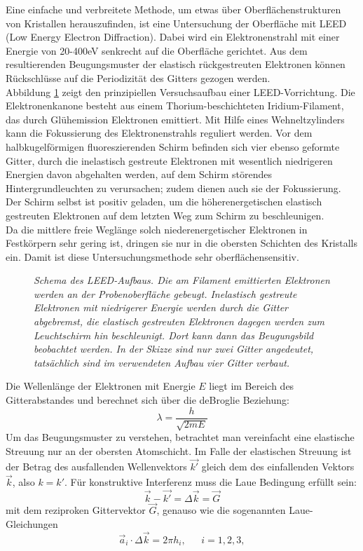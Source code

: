 \FloatBarrier

Eine einfache und verbreitete Methode, um etwas über Oberflächenstrukturen von
 Kristallen herauszufinden, ist eine Untersuchung der Oberfläche mit LEED (Low Energy Electron
 Diffraction).
 Dabei wird ein Elektronenstrahl mit einer Energie von 20-400eV senkrecht auf die
 Oberfläche gerichtet. Aus dem resultierenden
 Beugungsmuster der elastisch rückgestreuten Elektronen können Rückschlüsse auf die Periodizität des
 Gitters gezogen werden.\\
  Abbildung \ref{leedaufbau} zeigt den prinzipiellen Versuchsaufbau einer LEED-Vorrichtung. Die
 Elektronenkanone besteht aus einem Thorium-beschichteten Iridium-Filament, das durch Glühemission
 Elektronen emittiert. Mit Hilfe eines Wehneltzylinders kann die Fokussierung
 des Elektronenstrahls reguliert werden. Vor dem halbkugelförmigen fluoreszierenden Schirm befinden
 sich vier ebenso geformte Gitter, durch die inelastisch gestreute Elektronen mit wesentlich
 niedrigeren Energien davon abgehalten werden, auf dem Schirm störendes Hintergrundleuchten zu
 verursachen; zudem dienen auch sie der Fokussierung. Der Schirm selbst ist positiv geladen, um
 die höherenergetischen elastisch gestreuten Elektronen auf dem letzten Weg zum Schirm zu beschleunigen.\\
  Da die mittlere freie Weglänge solch niederenergetischer Elektronen in
 Festkörpern sehr gering ist, dringen sie nur in die obersten Schichten des
 Kristalls ein. Damit ist diese Untersuchungsmethode sehr oberflächensensitiv.

 \begin{figure}[htbp]
	\centering
	\sffamily 
	
	\caption{\textit{Schema des LEED-Aufbaus. Die am Filament emittierten Elektronen werden an der
	Probenoberfläche gebeugt. Inelastisch gestreute Elektronen mit niedrigerer Energie werden durch die
	Gitter abgebremst, die elastisch gestreuten Elektronen dagegen werden zum Leuchtschirm
	hin beschleunigt. Dort kann dann das Beugungsbild beobachtet werden. In der Skizze sind nur zwei
	Gitter angedeutet, tatsächlich sind im verwendeten Aufbau vier Gitter verbaut.}}
	\label{leedaufbau}
\end{figure}






 Die Wellenlänge der Elektronen mit Energie $E$ liegt im Bereich des Gitterabstandes und
 berechnet sich über die deBroglie Beziehung:
 \[\lambda=\frac{h}{\sqrt{2mE}}\]%
Um das Beugungsmuster zu verstehen, betrachtet man vereinfacht eine elastische
Streuung nur an der obersten Atomschicht. Im Falle der elastischen Streuung ist
der Betrag des ausfallenden Wellenvektors $\vec{k'}$ gleich dem des
einfallenden Vektors $\vec{k}$, also $k=k'$. Für konstruktive Interferenz
muss die Laue Bedingung erfüllt sein:
\[\vec{k}-\vec{k'}=\Delta \vec{k}=\vec{G}\]
mit dem reziproken Gittervektor $\vec{G}$, genauso wie die sogenannten Laue-Gleichungen
\[\vec{a}_i\cdot \Delta \vec{k}=2\pi h_i,~~~~~~~i=1, 2, 3,\]

